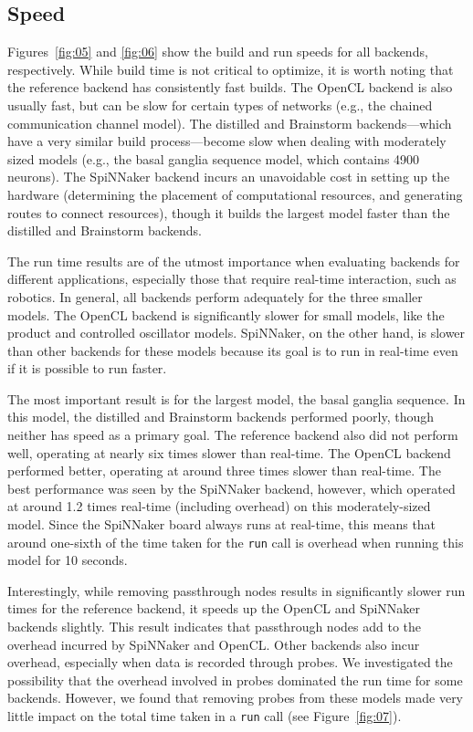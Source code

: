 \documentclass{frontiersSCNS}
\begin{document}
\subsection{Speed}

Figures~\ref{fig:05} and \ref{fig:06} show
the build and run speeds for all backends, respectively.
While build time is not critical to optimize,
it is worth noting that the reference backend
has consistently fast builds.
The OpenCL backend is also usually fast,
but can be slow for certain types of networks
(e.g., the chained communication channel model).
The distilled and Brainstorm backends---which
have a very similar build process---become
slow when dealing with moderately sized models
(e.g., the basal ganglia sequence model,
which contains 4900 neurons).
The SpiNNaker backend incurs an unavoidable cost
in setting up the hardware
(determining the placement of computational resources,
and generating routes to connect resources),
though it builds the largest model faster than
the distilled and Brainstorm backends.

The run time results are of the utmost importance
when evaluating backends for different applications,
especially those that require real-time interaction,
such as robotics. In general, all backends
perform adequately for the three smaller models.
The OpenCL backend is significantly slower for small
models, like the product and controlled oscillator models.
SpiNNaker, on the other hand, is slower than other backends
for these models because its goal
is to run in real-time even if it is possible to run faster.

The most important result is for the largest model,
the basal ganglia sequence.
In this model, the distilled and Brainstorm backends
performed poorly,
though neither has speed as a primary goal.
The reference backend also did not perform well,
operating at nearly six times slower than real-time.
The OpenCL backend performed better, operating at around
three times slower than real-time.
The best performance was seen by the SpiNNaker backend,
however, which operated at around 1.2 times real-time
(including overhead) on this moderately-sized model.
Since the SpiNNaker board always runs at real-time,
this means that around one-sixth of the time taken
for the \texttt{run} call is overhead
when running this model for 10 seconds.

Interestingly, while removing passthrough nodes
results in significantly slower run times
for the reference backend,
it speeds up the OpenCL and SpiNNaker backends slightly.
This result indicates that passthrough nodes
add to the overhead incurred by
SpiNNaker and OpenCL.
Other backends also incur overhead,
especially when data is recorded
through probes.
We investigated the possibility
that the overhead involved in probes
dominated the run time for some backends.
However, we found that
removing probes from these models
made very little impact on
the total time taken in a \texttt{run} call
(see Figure~\ref{fig:07}).
\end{document}
